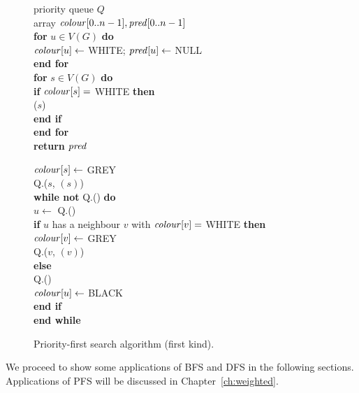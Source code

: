 \begin{figure}
\hspace*{.4in}\begin{minipage}{5in}
{
\> priority queue $Q$\\
\> array $\operatorname{\text{\textit{colour}}}[0..n-1], \operatorname{\text{\textit{pred}}}[0..n-1]$ \\
\> \textbf{for} $u \in V(G)$ \textbf{do} \\
\> \> $\operatorname{\text{\textit{colour}}}[u] \gets $ WHITE; $\operatorname{\text{\textit{pred}}}[u] \gets $ NULL \\
\> \textbf{end for}\\
\> \textbf{for}  $s\in V(G)$ \textbf{do} \\
\> \> \textbf{if} $\operatorname{\text{\textit{colour}}}[s] = $ WHITE \textbf{then} \\
\> \> \> ($s$) \\
\> \> \textbf{end if}\\
\> \textbf{end for}\\
\> \textbf{return} $\operatorname{\text{\textit{pred}}}$\\
}

{
\> $\operatorname{\text{\textit{colour}}}[s] \gets $ GREY \\
\> Q.($s$,  $(s)$) \\
\> \textbf{while not} Q.() \textbf{do} \\
\> \> $u \gets $ Q.() \\
\> \>  \textbf{if} $u$ has a neighbour $v$ with $\operatorname{\text{\textit{colour}}}[v] = $ WHITE \textbf{then} \\
\> \> \> $\operatorname{\text{\textit{colour}}}[v] \gets $ GREY \\
\> \> \> Q.($v$,  $(v)$) \\
\> \> \textbf{else} \\
\> \> \> Q.() \\
\> \> \> $\operatorname{\text{\textit{colour}}}[u] \gets $ BLACK \\
\> \> \textbf{end if} \\
\> \textbf{end while}
}
\end{minipage}
\caption{Priority-first search algorithm (first kind).}
\label{fig:PFScode}
\vspace*{-.2cm}
\end{figure}

We proceed to show some applications of BFS and DFS in the following
sections. Applications of PFS will be discussed in
Chapter~\ref{ch:weighted}.

